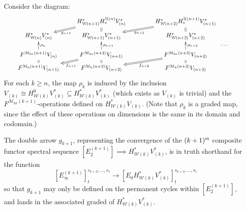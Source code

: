\documentclass[11pt]{amsart} \renewcommand{\baselinestretch}{1.4}
\theoremstyle{plain}
\theoremstyle{definition}
\renewcommand{\to}{\longrightarrow}
\newcommand{\calU}{\mathcal{U}}
\newcommand{\calw}{\mathcal{W}}
\newcommand{\calMh}{\mathcal{M}\dhor}
\newcommand{\calMhv}{\mathcal{M}_\mathrm{hv}}
\newcommand{\E}[5]{[E^{#1}_{#2}#3]^{#4}_{#5}}
\newcommand{\dhor}{_\mathrm{h}}
\begin{document}
\begin{Calculations of HWn for n nonzero}
Consider the diagram:
\[\qquad\xymatrix@R=1.5mm{
&
H^*_{\calw({n+1})}H_*^{\calU(n)}V^*_{(n)}\ar@{=>}[dl]^-{g_{n+1}}\ar@{=}[d]&
H^*_{\calw({n+2})}H_*^{\calU({n+1})}V^*_{({n+1})}\ar@{=>}[dl]^-{g_{n+2}}\ar@{=}[d]&
\\
 H^*_{\calw(n)}V^*_{(n)}
&H^*_{\calw({n+1})}V^*_{({n+1})}
&H^*_{\calw({n+2})}V^*_{({n+2})}
\\
&&\makebox[5cm][r]{\,$\smash{\cdots }$}
\\
 F^{\calMhv({n+1})}V_{(n)}\ar[uu]_-{\rho_n}\ar@{=}[d]
&F^{\calMhv({n+2})}V_{({n+1})}\ar[uu]_-{\rho_{n+1}}\ar@{=}[d]\ar@{=>}[ld]^-{f_{n+1}}
&F^{\calMhv({n+3})}V_{({n+2})}\ar[uu]_-{\rho_{n+2}}\ar@{=}[d]\ar@{=>}[ld]^-{f_{n+2}}
\\
 F^{\calMh({n+1})}V_{({n+1})}
&F^{\calMh({n+2})}V_{({n+2})}
&F^{\calMh({n+3})}V_{({n+3})}
}\]
For each $k\geq n$, the map $\rho_k$ is induced by the inclusion $V_{(k)}\cong H^{0}_{\calw(k)}V^*_{(k)}\subseteq H^*_{\calw(k)}V^*_{(k)}$ (which exists as $V_{(k)}$ is trivial) and the $F^{\calMhv(k+1)}$-operations defined on $H^*_{\calw(k)}V_{(k)}$. (Note that $\rho_{k}$ is a graded map, since the effect of these operations on dimensions is the same in its domain and codomain.)

The double arrow $g_{k+1}$, representing the convergence of the $(k+1)^{\textup{st}}$ composite functor spectral sequence $\E{(k+1)}{2}{}{}{}\implies H^*_{\calw(k)}V^*_{(k)}$, is in truth shorthand for the function
\[\E{(k+1)}{\infty}{}{s_{k+2},\ldots,s_1}{t}\to \E{}{0}{H^*_{\calw(k)}V^*_{(k)}}{s_{k+2},\ldots,s_1}{t} \]
so that $g_{k+1}$ may only be defined on the permanent cycles within $\E{(k+1)}{2}{}{}{}$, %
 and lands in the associated graded of $H^*_{\calw(k)}V^*_{(k)}$.


\end{Calculations of HWn for n nonzero}
\end{document}
